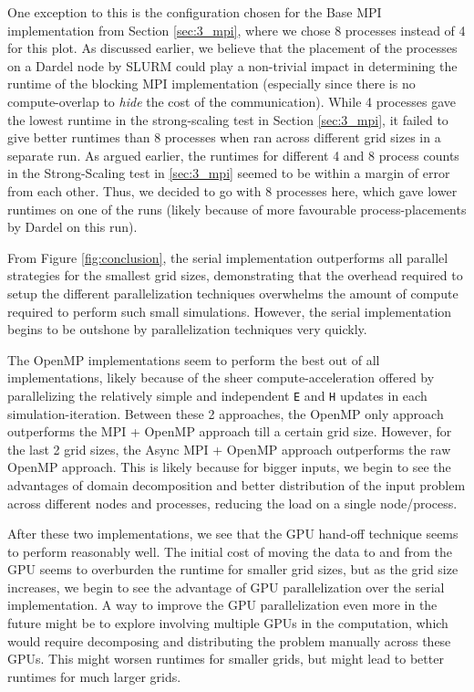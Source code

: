 \documentclass[a4paper,10pt]{article}
\begin{document}
\begin{multicols}{2}
One exception to this is the configuration chosen for the Base MPI implementation from Section \ref{sec:3_mpi}, where we chose 8 processes instead of 4 for this plot. As discussed earlier, we believe that the placement of the processes on a Dardel node by SLURM could play a non-trivial impact in determining the runtime of the blocking MPI implementation (especially since there is no compute-overlap to \textit{hide} the cost of the communication). While 4 processes gave the lowest runtime in the strong-scaling test in Section \ref{sec:3_mpi}, it failed to give better runtimes than 8 processes when ran across different grid sizes in a separate run. As argued earlier, the runtimes for different 4 and 8 process counts in the Strong-Scaling test in \ref{sec:3_mpi} seemed to be within a margin of error from each other. Thus, we decided to go with 8 processes here, which gave lower runtimes on one of the runs (likely because of more favourable process-placements by Dardel on this run). 

From Figure \ref{fig:conclusion}, the serial implementation outperforms all parallel strategies for the smallest grid sizes, demonstrating that the overhead required to setup the different parallelization techniques overwhelms the amount of compute required to perform such small simulations. However, the serial implementation begins to be outshone by parallelization techniques very quickly.

The OpenMP implementations seem to perform the best out of all implementations, likely because of the sheer compute-acceleration offered by parallelizing the relatively simple and independent \verb|E| and \verb|H| updates in each simulation-iteration. Between these 2 approaches, the OpenMP only approach outperforms the MPI + OpenMP approach till a certain grid size. However, for the last 2 grid sizes, the Async MPI + OpenMP approach outperforms the raw OpenMP approach. This is likely because for bigger inputs, we begin to see the advantages of domain decomposition and better distribution of the input problem across different nodes and processes, reducing the load on a single node/process.

After these two implementations, we see that the GPU hand-off technique seems to perform reasonably well. The initial cost of moving the data to and from the GPU seems to overburden the runtime for smaller grid sizes, but as the grid size increases, we begin to see the advantage of GPU parallelization over the serial implementation. A way to improve the GPU parallelization even more in the future might be to explore involving multiple GPUs in the computation, which would require decomposing and distributing the problem manually across these GPUs. This might worsen runtimes for smaller grids, but might lead to better runtimes for much larger grids. 


\end{multicols}
\end{document}
